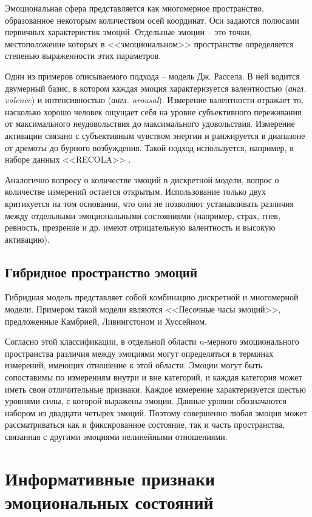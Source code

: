 Эмоциональная сфера представляется как многомерное пространство, образованное некоторым
количеством осей координат. Оси задаются полюсами первичных характеристик эмоций. Отдельные эмоции -- это точки, местоположение которых в <<эмоциональном>> пространстве определяется степенью выраженности этих параметров.

Один из примеров описываемого подхода -- модель Дж. Рассела. В ней водится двумерный базис, в котором каждая эмоция характеризуется валентностью (\textit{англ. valence}) и интенсивностью (\textit{англ. arousal}). Измерение валентности отражает то,
насколько хорошо человек ощущает себя на уровне субъективного переживания от максимального неудовольствия до максимального удовольствия. Измерение активации связано с
субъективным чувством энергии и ранжируется в диапазоне от дремоты до бурного возбуждения. Такой подход используется, например, в наборе данных <<RECOLA>> \cite{RECOLA}.

Аналогично вопросу о количестве эмоций в дискретной модели, вопрос о количестве измерений остается открытым. Использование только двух критикуется на том основании, что они не позволяют устанавливать различия между отдельными эмоциональными состояниями (например, страх, гнев, ревность, презрение и др. имеют отрицательную валентность и высокую активацию).

\subsection{Гибридное пространство эмоций}
Гибридная модель представляет собой комбинацию дискретной и многомерной модели. Примером такой модели являются <<Песочные часы эмоций>>, предложенные Камбрией, Ливингстоном и Хуссейном. \cite{hourglass} 

Согласно этой классификации, в отдельной области $n$-мерного эмоционального пространства различия между эмоциями могут определяться в терминах измерений, имеющих отношение к этой области. Эмоции могут быть сопоставимы по измерениям внутри и вне категорий, и каждая категория может иметь свои отличительные признаки. \cite{Russell2003} Каждое измерение характеризуется шестью уровнями силы, с которой выражены эмоции. Данные уровни обозначаются набором из двадцати четырех эмоций. Поэтому совершенно любая эмоция может рассматриваться как и фиксированное состояние, так и часть пространства, связанная с другими эмоциями нелинейными отношениями. 

\section{Информативные признаки эмоциональных состояний}
